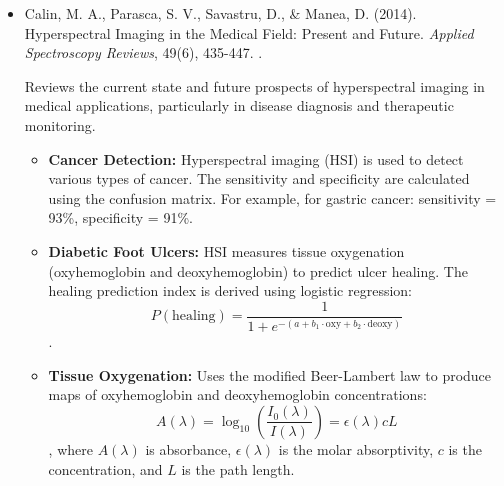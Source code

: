 \documentclass[10pt,svgnames,fragile]{beamer}
\begin{document}
\begin{frame}{}
\tiny
\begin{itemize}
    
    \item Calin, M. A., Parasca, S. V., Savastru, D., \& Manea, D. (2014). Hyperspectral Imaging in the Medical Field: Present and Future. \textit{Applied Spectroscopy Reviews}, 49(6), 435-447. \href{https://doi.org/10.1080/05704928.2013.838678}{\color{blue}{DOI: 10.1080/05704928.2013.838678}}. \cite{calinHyperspectralImagingMedical2014}
    
    {\color{gray}Reviews the current state and future prospects of hyperspectral imaging in medical applications, particularly in disease diagnosis and therapeutic monitoring.}
    \begin{itemize} \tiny
    \item \textbf{Cancer Detection:} Hyperspectral imaging (HSI) is used to detect various types of cancer. The sensitivity and specificity are calculated using the confusion matrix. For example, for gastric cancer: sensitivity = 93\%, specificity = 91\%.
    \item \textbf{Diabetic Foot Ulcers:} HSI measures tissue oxygenation (oxyhemoglobin and deoxyhemoglobin) to predict ulcer healing. The healing prediction index is derived using logistic regression: \[ P(\text{healing}) = \frac{1}{1 + e^{-(a + b_1 \cdot \text{oxy} + b_2 \cdot \text{deoxy})}} \].
    \item \textbf{Tissue Oxygenation:} Uses the modified Beer-Lambert law to produce maps of oxyhemoglobin and deoxyhemoglobin concentrations: \[ A(\lambda) = \log_{10}\left(\frac{I_0(\lambda)}{I(\lambda)}\right) = \epsilon(\lambda) c L \], where \( A(\lambda) \) is absorbance, \( \epsilon(\lambda) \) is the molar absorptivity, \( c \) is the concentration, and \( L \) is the path length.
    
\end{itemize}

\end{itemize}
\end{frame}
\end{document}

